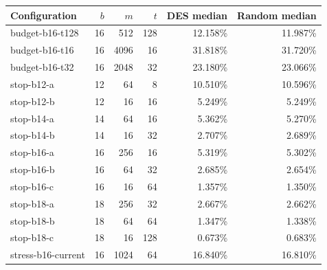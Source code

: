\begin{tabular}{lrrrrr}
\toprule
Configuration & $b$ & $m$ & $t$ & DES median & Random median \\
\midrule
budget-b16-t128 & 16 & 512 & 128 & 12.158\% & 11.987\% \\
budget-b16-t16 & 16 & 4096 & 16 & 31.818\% & 31.720\% \\
budget-b16-t32 & 16 & 2048 & 32 & 23.180\% & 23.066\% \\
stop-b12-a & 12 & 64 & 8 & 10.510\% & 10.596\% \\
stop-b12-b & 12 & 16 & 16 & 5.249\% & 5.249\% \\
stop-b14-a & 14 & 64 & 16 & 5.362\% & 5.270\% \\
stop-b14-b & 14 & 16 & 32 & 2.707\% & 2.689\% \\
stop-b16-a & 16 & 256 & 16 & 5.319\% & 5.302\% \\
stop-b16-b & 16 & 64 & 32 & 2.685\% & 2.654\% \\
stop-b16-c & 16 & 16 & 64 & 1.357\% & 1.350\% \\
stop-b18-a & 18 & 256 & 32 & 2.667\% & 2.662\% \\
stop-b18-b & 18 & 64 & 64 & 1.347\% & 1.338\% \\
stop-b18-c & 18 & 16 & 128 & 0.673\% & 0.683\% \\
stress-b16-current & 16 & 1024 & 64 & 16.840\% & 16.810\% \\
\bottomrule
\end{tabular}
